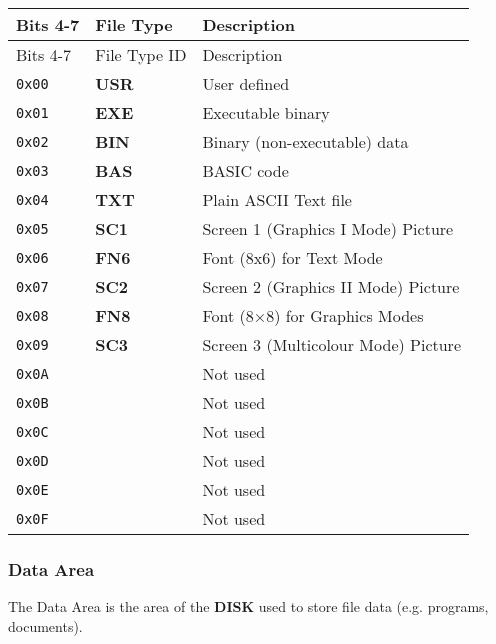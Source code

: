        \begin{longtable}{ |m{1.4cm}|m{1.7cm}|m{6.8cm}| }
            \hline
            \rowcolor{lightgray}
            Bits 4-7 & File Type & Description\\
            \hline
            \endfirsthead

            \hline
            \rowcolor{lightgray}
            Bits 4-7 & File Type ID & Description\\
            \hline
            \endhead

            \texttt{0x00} & \textbf{USR} & User defined\\
            \texttt{0x01} & \textbf{EXE} & Executable binary\\
            \texttt{0x02} & \textbf{BIN} & Binary (non-executable) data\\
            \texttt{0x03} & \textbf{BAS} & BASIC code\\
            \texttt{0x04} & \textbf{TXT} & Plain ASCII Text file\\
            \texttt{0x05} & \textbf{SC1} & Screen 1 (Graphics I Mode) Picture\\
            \texttt{0x06} & \textbf{FN6} & Font (8x6) for Text Mode\\
            \texttt{0x07} & \textbf{SC2} & Screen 2 (Graphics II Mode) Picture\\
            \texttt{0x08} & \textbf{FN8} & Font (8×8) for Graphics Modes\\
            \texttt{0x09} & \textbf{SC3} & Screen 3 (Multicolour Mode) Picture\\
            \texttt{0x0A} & & Not used\\
            \texttt{0x0B} & & Not used\\
            \texttt{0x0C} & & Not used\\
            \texttt{0x0D} & & Not used\\
            \texttt{0x0E} & & Not used\\
            \texttt{0x0F} & & Not used\\
            \hline
        \end{longtable}

        \subsubsection{Data Area}
        The Data Area is the area of the \textbf{DISK} used to store file data 
        (e.g. programs, documents).
        
